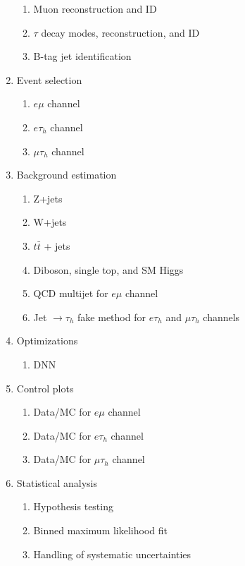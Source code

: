 \documentclass{article}
\begin{document}
\begin{enumerate}
        \begin{enumerate}
            \item Muon reconstruction and ID 
            \item $\tau$ decay modes, reconstruction, and ID
            \item B-tag jet identification
        \end{enumerate}
    \item Event selection 
        \begin{enumerate}
            \item $e\mu$ channel
            \item $e\tau_{h}$ channel
            \item $\mu\tau_{h}$ channel
        \end{enumerate}
    \item Background estimation 
        \begin{enumerate}
            \item Z+jets
            \item W+jets
            \item $t\bar{t}$ + jets
            \item Diboson, single top, and SM Higgs
            \item QCD multijet for $e\mu$ channel
            \item Jet $\rightarrow \tau_{h}$ fake method for $e\tau_{h}$ and $\mu\tau_{h}$ channels
        \end{enumerate}
    \item Optimizations
        \begin{enumerate}
            \item DNN
        \end{enumerate}
    \item Control plots
        \begin{enumerate}
            \item Data/MC for $e\mu$ channel
            \item Data/MC for $e\tau_{h}$ channel
            \item Data/MC for $\mu\tau_{h}$ channel
        \end{enumerate}
    \item Statistical analysis
        \begin{enumerate}
            \item Hypothesis testing
            \item Binned maximum likelihood fit 
            \item Handling of systematic uncertainties

\end{enumerate}
\end{enumerate}
\end{document}
